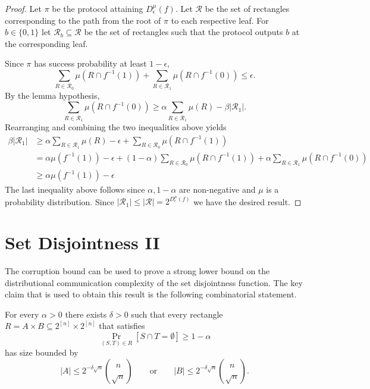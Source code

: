 \begin{proof}
Let $\pi$ be the protocol attaining $D_\epsilon^{\mu}(f)$.
Let $\mathcal{R}$ be the set of rectangles corresponding to the path from the root of $\pi$ to each respective leaf. For $b \in \{0,1\}$ let $\mathcal{R}_b \subseteq \mathcal{R}$ be the set of rectangles such that the protocol outputs $b$ at the corresponding leaf.

Since $\pi$ has success probability at least $1-\epsilon$,
$$\sum_{R \in \mathcal{R}_0} \mu(R\cap f^{-1}(1)) + \sum_{R \in \mathcal{R}_1} \mu(R\cap f^{-1}(0)) \leq \epsilon.$$
By the lemma hypothesis,
$$\sum_{R \in \mathcal{R}_1}\mu(R\cap f^{-1}(0)) \geq \alpha\sum_{R \in \mathcal{R}_1}\mu(R) -\beta\left|\mathcal{R}_1\right|.$$
Rearranging and combining the two inequalities above yields
\begin{align*}
    \beta|\mathcal{R}_1| &\geq \alpha\sum_{R \in \mathcal{R}_1}\mu(R) - \epsilon + \sum_{R \in \mathcal{R}_0}\mu(R\cap f^{-1}(1))\\
    &=\alpha \mu(f^{-1}(1)) - \epsilon + (1-\alpha)\sum_{R \in \mathcal{R}_0}\mu(R\cap f^{-1}(1))+\alpha \sum_{R \in \mathcal{R}_1}\mu(R\cap f^{-1}(0))\\
    &\geq \alpha \mu(f^{-1}(1)) - \epsilon
\end{align*}
The last inequality above follows since $\alpha, 1-\alpha$ are non-negative and $\mu$ is a probability distribution. Since $|\mathcal{R}_1| \leq |\mathcal{R}| = 2^{D^\mu_\epsilon(f)}$ we have the desired result.
\end{proof}



\newpage \section{Set Disjointness II}

The corruption bound can be used to prove a strong lower bound on the distributional communication complexity of the set disjointness function. The key claim that is used to obtain this result is the following combinatorial statement.

\begin{proposition}
For every $\alpha >0$ there exists $\delta>0$ such that every rectangle $R = A \times B \subseteq 2^{[n]} \times 2^{[n]}$
that satisfies 
\[
\Pr_{(S,T) \in R}[ S \cap T = \emptyset ] \ge 1-\alpha
\]
has size bounded by
\[
|A| \le 2^{-\delta \sqrt{n}} \binom{n}{\sqrt{n}}
\qquad \mbox{or} \qquad
|B| \le 2^{-\delta \sqrt{n}} \binom{n}{\sqrt{n}}.
\]
\end{proposition}

